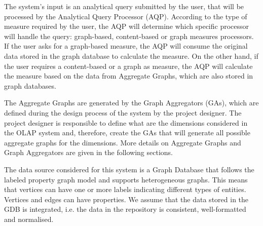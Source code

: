 The system's input is an analytical query submitted by the user, that will be processed by the Analytical Query Processor (AQP). According to the type of measure required by the user, the AQP will determine which specific processor will handle the query: graph-based, content-based or graph measures processors. If the user asks for a graph-based measure, the AQP will consume the original data stored in the graph database to calculate the measure. On the other hand, if the user requires a content-based or a graph as measure, the AQP will calculate the measure based on the data from Aggregate Graphs, which are also stored in graph databases.

The Aggregate Graphs are generated by the Graph Aggregators (GAs), which are defined during the design process of the system by the project designer. The project designer is responsible to define what are the dimensions considered in the OLAP system and, therefore, create the GAs that will generate all possible aggregate graphs for the dimensions. More details on Aggregate Graphs and Graph Aggregators are given in the following sections.

The data source considered for this system is a Graph Database that follows the labeled property graph model and supports heterogeneous graphs. This means that vertices can have one or more labels indicating different types of entities. Vertices and edges can have properties. We assume that the data stored in the GDB is integrated, i.e. the data in the repository is consistent, well-formatted and normalised.

